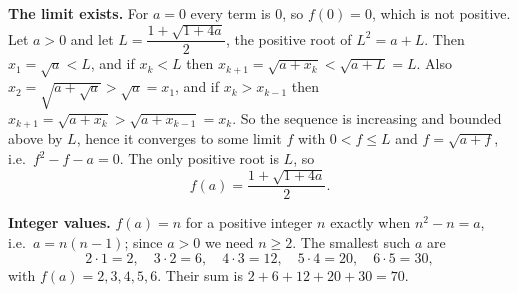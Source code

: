 \textbf{The limit exists.} For $a=0$ every term is $0$, so $f(0)=0$, which is not positive. Let $a>0$ and let $L=\dfrac{1+\sqrt{1+4a}}{2}$, the positive root of $L^2=a+L$. Then $x_1=\sqrt a<L$, and if $x_k<L$ then $x_{k+1}=\sqrt{a+x_k}<\sqrt{a+L}=L$. Also $x_2=\sqrt{a+\sqrt a}>\sqrt a=x_1$, and if $x_k>x_{k-1}$ then $x_{k+1}=\sqrt{a+x_k}>\sqrt{a+x_{k-1}}=x_k$. So the sequence is increasing and bounded above by $L$, hence it converges to some limit $f$ with $0<f\le L$ and $f=\sqrt{a+f}$, i.e.\ $f^2-f-a=0$. The only positive root is $L$, so
\[
f(a)=\dfrac{1+\sqrt{1+4a}}{2}.
\]

\textbf{Integer values.} $f(a)=n$ for a positive integer $n$ exactly when $n^2-n=a$, i.e.\ $a=n(n-1)$; since $a>0$ we need $n\ge2$. The smallest such $a$ are
\[
2\cdot1=2,\quad3\cdot2=6,\quad4\cdot3=12,\quad5\cdot4=20,\quad6\cdot5=30,
\]
with $f(a)=2,3,4,5,6$. Their sum is $2+6+12+20+30=\boxed{70}$.
